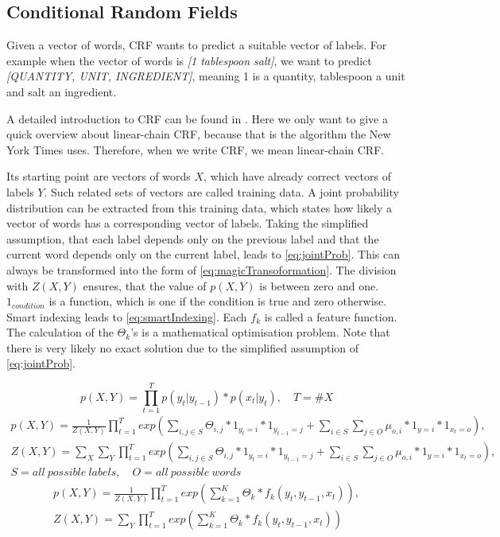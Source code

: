 \documentclass[12pt, twoside]{report}
\begin{document}
\subsection{Conditional Random Fields}
Given a vector of words, CRF wants to predict a suitable vector of labels. For example when the vector of words is \textit{[1 tablespoon salt]}, we want to predict \textit{[QUANTITY, UNIT, INGREDIENT]}, meaning 1 is a quantity, tablespoon a unit and salt an ingredient.

A detailed introduction to CRF can be found in \parencite{CRFIntroduction}. Here we only want to give a quick overview about linear-chain CRF, because that is the algorithm the New York Times uses. Therefore, when we write CRF, we mean linear-chain CRF.

Its starting point are vectors of words $X$, which have already correct vectors of labels $Y$. Such related sets of vectors are called training data. A joint probability distribution can be extracted from this training data, which states how likely a vector of words has a corresponding vector of labels. Taking the simplified assumption, that each label depends only on the previous label and that the current word depends only on the current label, leads to \cref{eq:jointProb}. This can always be transformed into the form of \cref{eq:magicTransoformation}. The division with $Z(X,Y)$ ensures, that the value of $p(X,Y)$ is between zero and one. $1_{condition}$ is a function, which is one if the condition is true and zero otherwise. Smart indexing leads to \cref{eq:smartIndexing}. Each $f_k$ is called a feature function. The calculation of the $\Theta_k$'s is a mathematical optimisation problem. Note that there is very likely no exact solution due to the simplified assumption of \cref{eq:jointProb}.

\begin{equation} \label{eq:jointProb}
p(X,Y) = \prod_{t=1}^T p(y_t|y_{t-1}) * p(x_t|y_t), \quad T = \#X
\end{equation}
\begin{align}\label{eq:magicTransoformation}
p(X,Y) = \frac{1}{Z(X,Y)}\prod_{t=1}^T exp(\sum_{i,j\in S}^{} \Theta_{i,j} * 1_{y_t=i} * 1_{y_{t-1}=j} + \sum_{i \in S}^{} \sum_{j \in O}^{} \mu_{o,i} * 1_{y=i} * 1_{x_t=o}), \nonumber
\\
Z(X,Y) = \sum_{X}^{}\sum_{Y}^{}\prod_{t=1}^T exp(\sum_{i,j\in S}^{} \Theta_{i,j} * 1_{y_t=i} * 1_{y_{t-1}=j} + \sum_{i \in S}^{} \sum_{j \in O}^{} \mu_{o,i} * 1_{y=i} * 1_{x_t=o}), \nonumber
\\
S = all\ possible\ labels, \quad O = all\ possible\ words
\end{align}
\begin{align} \label{eq:smartIndexing}
p(X,Y) = \frac{1}{Z(X,Y)}\prod_{t=1}^T exp(\sum_{k=1}^{K} \Theta_{k} * f_k(y_t, y_{t-1}, x_t)), \nonumber
\\
Z(X,Y) = \sum_{Y}^{}\prod_{t=1}^T exp(\sum_{k=1}^{K} \Theta_{k} * f_k(y_t, y_{t-1}, x_t))
\end{align}
\end{document}
